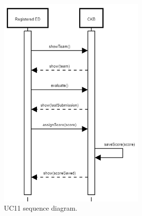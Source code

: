 \begin{center}
  \begin{figure} [H]
    \begin{center}
        \includegraphics[width=0.65\textwidth,height=\textheight,keepaspectratio]{Images/SequenceDiagrams/UC11.png}
        \caption{UC11 sequence diagram.}
        \label{fig: UC11_sequence_diagram}
    \end{center}
  \end{figure}
\end{center}


